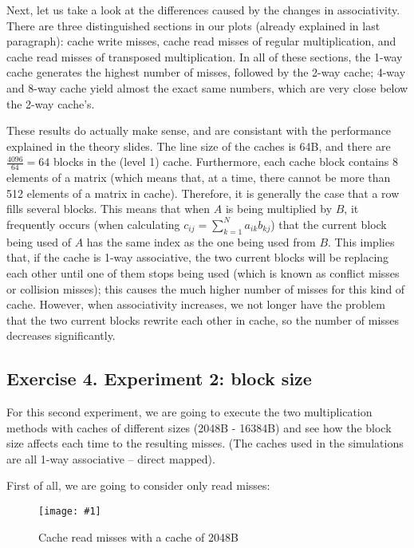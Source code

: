 \documentclass{article}
\newcommand{\myFigure}[4]{%
    \begin{figure}[!ht]
        \texttt{[image: \#1]}
        \centering
        \caption{#2}
        \label{#3}
    \end{figure}
}
\begin{document}
Next, let us take a look at the differences caused by the changes in associativity. There are three distinguished sections in our plots (already explained in last paragraph): cache write misses, cache read misses of regular multiplication, and cache read misses of transposed multiplication. In all of these sections, the 1-way cache generates the highest number of misses, followed by the 2-way cache; 4-way and 8-way cache yield almost the exact same numbers, which are very close below the 2-way cache's. 

These results do actually make sense, and are consistant with the performance explained in the theory slides. The line size of the caches is 64B, and there are $\frac{4096}{64}=64$ blocks in the (level 1) cache. 
Furthermore, each cache block contains 8 elements of a matrix (which means that, at a time, there cannot be more than 512 elements of a matrix in cache). Therefore, it is generally the case that a row fills several blocks.
This means that when $A$ is being multiplied by $B$, it frequently occurs (when calculating $c_{ij}=\sum_{k=1}^N a_{ik}b_{kj}$) that the current block being used of $A$ has the same index as the one being used from $B$. This implies that, if the cache is 1-way associative, the two current blocks will be replacing each other until one of them stops being used (which is known as conflict misses or collision misses); this causes the much higher number of misses for this kind of cache. However, when associativity increases, we not longer have the problem that the two current blocks rewrite each other in cache, so the number of misses decreases significantly.


\subsection*{Exercise 4. Experiment 2: block size}


For this second experiment, we are going to execute the two multiplication methods with caches of different sizes (2048B - 16384B) and see how the block size affects each time to the resulting misses. (The caches used in the simulations are all 1-way associative -- direct mapped).

First of all, we are going to consider only read misses:


\myFigure{../material_P3/protect_out4/BlockSize_2048/cache_lectura.png}{Cache read misses with a cache of 2048B}{block_2048_lec}{0.52}
\end{document}
